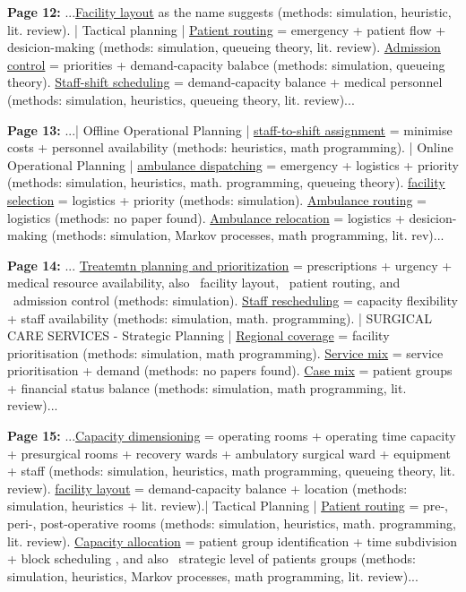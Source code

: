     \textbf{Page 12:}
    ...\underline{Facility layout} as the name suggests (methods: simulation, heuristic, lit. review). | Tactical planning | \underline{Patient routing} = emergency + patient flow + desicion-making (methods: simulation, queueing theory, lit. review). \underline{Admission control} = priorities + demand-capacity balabce (methods: simulation, queueing theory). \underline{Staff-shift scheduling} = demand-capacity balance + medical personnel (methods: simulation, heuristics, queueing theory, lit. review)...
    
    \textbf{Page 13:}
    ...| Offline Operational Planning | \underline{staff-to-shift assignment} = minimise costs + personnel availability (methods: heuristics, math programming). | Online Operational Planning | \underline{ambulance dispatching} = emergency + logistics + priority (methods: simulation, heuristics, math. programming, queueing theory). \underline{facility selection} = logistics + priority (methods: simulation). \underline{Ambulance routing} = logistics (methods: no paper found). \underline{Ambulance relocation} = logistics + desicion-making (methods: simulation, Markov processes, math programming, lit. rev)...
    
    \textbf{Page 14:}
    ... \underline{Treatemtn planning and prioritization} = prescriptions + urgency + medical resource availability, also ~facility layout, ~patient routing, and ~admission control (methods: simulation). \underline{Staff rescheduling} = capacity flexibility + staff availability (methods: simulation, math. programming). | SURGICAL CARE SERVICES - Strategic Planning | \underline{Regional coverage} = facility prioritisation (methods: simulation, math programming). \underline{Service mix} = service prioritisation + demand (methods: no papers found). \underline{Case mix} = patient groups + financial status balance (methods: simulation, math programming, lit. review)...
    
    \textbf{Page 15:}
    ...\underline{Capacity dimensioning} = operating rooms + operating time capacity + presurgical rooms + recovery wards + ambulatory surgical ward + equipment + staff (methods: simulation, heuristics, math programming, queueing theory, lit. review). \underline{facility layout} = demand-capacity balance + location (methods: simulation, heuristics + lit. review).| Tactical Planning | \underline{Patient routing} = pre-, peri-, post-operative rooms (methods: simulation, heuristics, math. programming, lit. review). \underline{Capacity allocation} = patient group identification + time subdivision + block scheduling , and also ~strategic level of patients groups (methods: simulation, heuristics, Markov processes, math programming, lit. review)...

